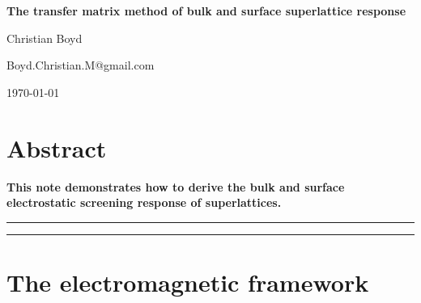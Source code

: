 \documentclass{article}
\begin{document}
\begin{center}{\Large \textbf{
The transfer matrix method of bulk and surface superlattice response
}}\end{center}

\begin{center}
Christian Boyd
\end{center}

\begin{center}
{\small \sf Boyd.Christian.M@gmail.com}
\end{center}

\begin{center}
\today
\end{center}


\section*{Abstract}
{\bf
This note demonstrates how to derive the bulk and surface electrostatic screening response of superlattices.
}

\vspace{10pt}
\noindent\rule{\textwidth}{1pt}
\tableofcontents
\noindent\rule{\textwidth}{1pt}
\vspace{10pt}











\section{The electromagnetic framework}
\label{section: electromagnetic framework}
\end{document}
